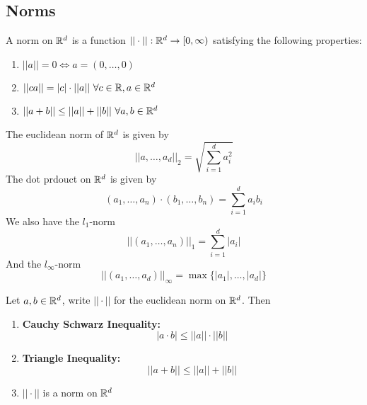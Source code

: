 \documentclass[openany]{report}
\begin{document}
\subsection{Norms}
\begin{definition}
    A norm on $\mathbb{R}^d$ is a function $||\cdot||: \mathbb{R}^d \rightarrow [0,\infty)$ satisfying the following properties:
    \begin{enumerate}[label=(\roman*)]
        \item $||a|| = 0 \iff a = (0,\dots,0)$
        \item $||ca|| = |c|\cdot||a|| \ \forall c \in \mathbb{R}, a \in \mathbb{R}^d$
        \item $||a+b|| \leq ||a|| + ||b|| \ \forall a,b \in \mathbb{R}^d$
    \end{enumerate}
\end{definition}
The euclidean norm of $\mathbb{R}^d$ is given by
\[||a,\ldots,a_d||_2 = \sqrt{\sum_{i=1}^d a_i^2}\]
The dot prdouct on $\mathbb{R}^d$ is given by
\[(a_1,\ldots,a_n) \cdot (b_1,\ldots,b_n) = \sum_{i=1}^d a_ib_i\]
We also have the $l_1$-norm
\[||(a_1,\ldots, a_n)||_1 =\sum_{i=1}^d |a_i|\]
And the $l_\infty$-norm
\[||(a_1,\ldots, a_d)||_\infty = \max\{|a_1|,\ldots,|a_d|\}\]
\begin{prop}
    Let $a,b\in\mathbb{R}^d$, write $||\cdot||$ for the euclidean norm on $\mathbb{R}^d$. Then
    \begin{enumerate}[label=(\roman*)]
        \item \textbf{Cauchy Schwarz Inequality:} 
        \[|a\cdot b| \leq ||a||\cdot||b||\]
        \item \textbf{Triangle Inequality:}
        \[||a+b|| \leq ||a|| + ||b||\]
        \item $||\cdot||$ is a norm on $\mathbb{R}^d$
    \end{enumerate}
\end{prop}
\end{document}
